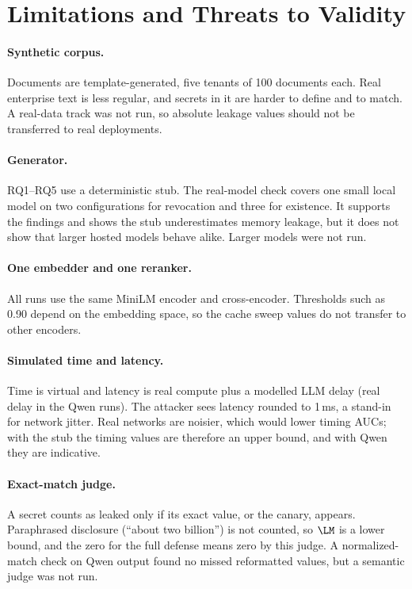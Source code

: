 \section{Limitations and Threats to Validity}
\label{sec:limits}

\paragraph{Synthetic corpus.}
Documents are template-generated, five tenants of 100 documents each. Real enterprise text is less regular, and secrets in it are harder to define and to match. A real-data track was not run, so absolute leakage values should not be transferred to real deployments.

\paragraph{Generator.}
RQ1--RQ5 use a deterministic stub. The real-model check covers one small local model on two configurations for revocation and three for existence. It supports the findings and shows the stub underestimates memory leakage, but it does not show that larger hosted models behave alike. Larger models were not run.

\paragraph{One embedder and one reranker.}
All runs use the same MiniLM encoder and cross-encoder. Thresholds such as 0.90 depend on the embedding space, so the cache sweep values do not transfer to other encoders.

\paragraph{Simulated time and latency.}
Time is virtual and latency is real compute plus a modelled LLM delay (real delay in the Qwen runs). The attacker sees latency rounded to 1\,ms, a stand-in for network jitter. Real networks are noisier, which would lower timing AUCs; with the stub the timing values are therefore an upper bound, and with Qwen they are indicative.

\paragraph{Exact-match judge.}
A secret counts as leaked only if its exact value, or the canary, appears. Paraphrased disclosure (``about two billion'') is not counted, so $\LM$ is a lower bound, and the zero for the full defense means zero by this judge. A normalized-match check on Qwen output found no missed reformatted values, but a semantic judge was not run.

